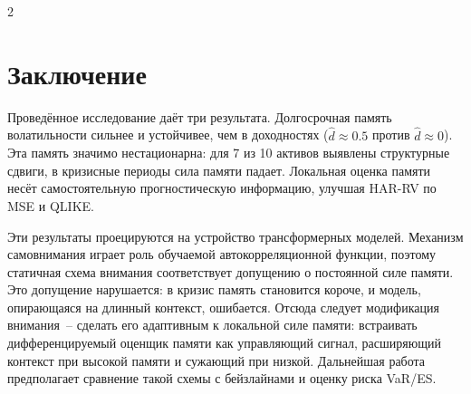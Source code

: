 \documentclass[a4paper,10pt,twoside]{article}
\begin{document}
\begin{multicols}{2}
\section*{Заключение}

Проведённое исследование даёт три результата. Долгосрочная память волатильности сильнее и устойчивее, чем в доходностях ($\hat d\approx0.5$ против $\hat d\approx0$). Эта память значимо нестационарна: для 7 из 10 активов выявлены структурные сдвиги, в кризисные периоды сила памяти падает. Локальная оценка памяти несёт самостоятельную прогностическую информацию, улучшая HAR-RV по MSE и QLIKE.

Эти результаты проецируются на устройство трансформерных моделей. Механизм самовнимания играет роль обучаемой автокорреляционной функции, поэтому статичная схема внимания соответствует допущению о постоянной силе памяти. Это допущение нарушается: в кризис память становится короче, и модель, опирающаяся на длинный контекст, ошибается. Отсюда следует модификация внимания~-- сделать его адаптивным к локальной силе памяти: встраивать дифференцируемый оценщик памяти как управляющий сигнал, расширяющий контекст при высокой памяти и сужающий при низкой. Дальнейшая работа предполагает сравнение такой схемы с бейзлайнами и оценку риска VaR/ES.


\end{multicols}
\end{document}
